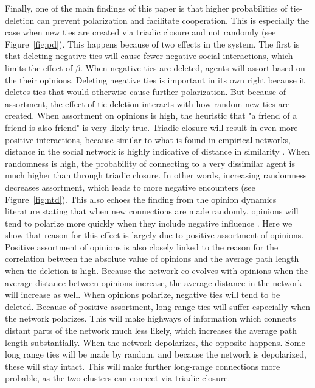 \documentclass{article}
\begin{document}
Finally, one of the main findings of this paper is that higher probabilities of tie-deletion can prevent polarization and facilitate cooperation. This is especially the case when new ties are created via triadic closure and not randomly (see Figure~\ref{fig:pd}). This happens because of two effects in the system. The first is that deleting negative ties will cause fewer negative social interactions, which limits the effect of $\beta$. When negative ties are deleted, agents will assort based on the their opinions. 
Deleting negative ties is important in its own right because it deletes ties that would otherwise cause further polarization. But because of assortment, the effect of tie-deletion interacts with how random new ties are created. When assortment on opinions is high, the heuristic that "a friend of a friend is also friend" is very likely true. Triadic closure will result in even more positive interactions, because similar to what is found in empirical networks, distance in the social network is highly indicative of distance in similarity \cite{kossinets_origins_2009}. When randomness is high, the probability of connecting to a very dissimilar agent is much higher than through triadic closure. In other words, increasing randomness decreases assortment, which leads to more negative encounters (see Figure~\ref{fig:ntd}). This also echoes the finding from the opinion dynamics literature stating that when new connections are made randomly, opinions will tend to polarize more quickly when they include negative influence \cite{flache_why_2006,flache_small_2011,turner_paths_2018}. Here we show that reason for this effect is largely due to positive assortment of opinions. 
Positive assortment of opinions is also closely linked to the reason for the correlation between the absolute value of opinions and the average path length when tie-deletion is high. Because the network co-evolves with opinions when the average distance between opinions increase, the average distance in the network will increase as well. When opinions polarize, negative ties will tend to be deleted. Because of positive assortment, long-range ties will suffer especially when the network polarizes. This will make highways of information which connects distant parts of the network much less likely, which increases the average path length substantially. When the network depolarizes, the opposite happens. Some long range ties will be made by random, and because the network is depolarized, these will stay intact. This will make further long-range connections more probable, as the two clusters can connect via triadic closure.
\end{document}
